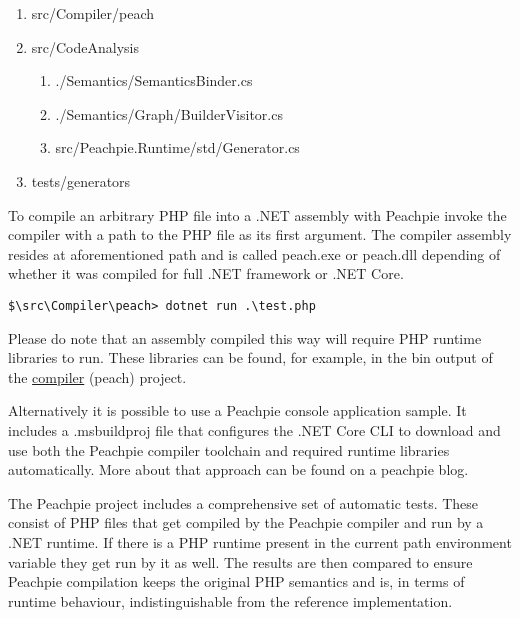 \begin{enumerate}
	\item \label{peach}src/Compiler/peach	
	\item src/CodeAnalysis
	\begin{enumerate}
		\item ./Semantics/SemanticsBinder.cs
		\item ./Semantics/Graph/BuilderVisitor.cs
		\item src/Peachpie.Runtime/std/Generator.cs
	\end{enumerate}
	\item tests/generators
\end{enumerate}

To compile an arbitrary PHP file into a .NET assembly with Peachpie invoke the compiler with a path to the PHP file as its first argument. The compiler assembly resides at aforementioned path and is called peach.exe or peach.dll depending of whether it was compiled for full .NET framework or .NET Core.

\begin{verbatim}
$\src\Compiler\peach> dotnet run .\test.php
\end{verbatim}

Please do note that an assembly compiled this way will require PHP runtime libraries to run. These libraries can be found, for example, in the bin output of the \hyperref[peach]{compiler} (peach) project.

Alternatively it is possible to use a Peachpie console application sample\footnotemark. It includes a .msbuildproj file that configures the .NET Core CLI to download and use both the Peachpie compiler toolchain and required runtime libraries automatically. More about that approach can be found on a peachpie blog\footnotemark.



The Peachpie project includes a comprehensive set of automatic tests. These consist of PHP files that get compiled by the Peachpie compiler and run by a .NET runtime. If there is a PHP runtime present in the current path environment variable they get run by it as well. The results are then compared to ensure Peachpie compilation keeps the original PHP semantics and is, in terms of runtime behaviour, indistinguishable from the reference implementation.

